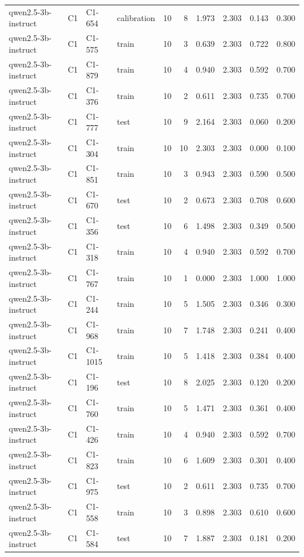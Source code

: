 \begin{table}
\begin{tabular}{llllrrrrrr}
qwen2.5-3b-instruct & C1 & C1-654 & calibration & 10 & 8 & 1.973 & 2.303 & 0.143 & 0.300 \\
qwen2.5-3b-instruct & C1 & C1-575 & train & 10 & 3 & 0.639 & 2.303 & 0.722 & 0.800 \\
qwen2.5-3b-instruct & C1 & C1-879 & train & 10 & 4 & 0.940 & 2.303 & 0.592 & 0.700 \\
qwen2.5-3b-instruct & C1 & C1-376 & train & 10 & 2 & 0.611 & 2.303 & 0.735 & 0.700 \\
qwen2.5-3b-instruct & C1 & C1-777 & test & 10 & 9 & 2.164 & 2.303 & 0.060 & 0.200 \\
qwen2.5-3b-instruct & C1 & C1-304 & train & 10 & 10 & 2.303 & 2.303 & 0.000 & 0.100 \\
qwen2.5-3b-instruct & C1 & C1-851 & train & 10 & 3 & 0.943 & 2.303 & 0.590 & 0.500 \\
qwen2.5-3b-instruct & C1 & C1-670 & test & 10 & 2 & 0.673 & 2.303 & 0.708 & 0.600 \\
qwen2.5-3b-instruct & C1 & C1-356 & test & 10 & 6 & 1.498 & 2.303 & 0.349 & 0.500 \\
qwen2.5-3b-instruct & C1 & C1-318 & train & 10 & 4 & 0.940 & 2.303 & 0.592 & 0.700 \\
qwen2.5-3b-instruct & C1 & C1-767 & train & 10 & 1 & 0.000 & 2.303 & 1.000 & 1.000 \\
qwen2.5-3b-instruct & C1 & C1-244 & train & 10 & 5 & 1.505 & 2.303 & 0.346 & 0.300 \\
qwen2.5-3b-instruct & C1 & C1-968 & train & 10 & 7 & 1.748 & 2.303 & 0.241 & 0.400 \\
qwen2.5-3b-instruct & C1 & C1-1015 & train & 10 & 5 & 1.418 & 2.303 & 0.384 & 0.400 \\
qwen2.5-3b-instruct & C1 & C1-196 & test & 10 & 8 & 2.025 & 2.303 & 0.120 & 0.200 \\
qwen2.5-3b-instruct & C1 & C1-760 & train & 10 & 5 & 1.471 & 2.303 & 0.361 & 0.400 \\
qwen2.5-3b-instruct & C1 & C1-426 & train & 10 & 4 & 0.940 & 2.303 & 0.592 & 0.700 \\
qwen2.5-3b-instruct & C1 & C1-823 & train & 10 & 6 & 1.609 & 2.303 & 0.301 & 0.400 \\
qwen2.5-3b-instruct & C1 & C1-975 & test & 10 & 2 & 0.611 & 2.303 & 0.735 & 0.700 \\
qwen2.5-3b-instruct & C1 & C1-558 & train & 10 & 3 & 0.898 & 2.303 & 0.610 & 0.600 \\
qwen2.5-3b-instruct & C1 & C1-584 & test & 10 & 7 & 1.887 & 2.303 & 0.181 & 0.200 \\

\end{tabular}
\end{table}

